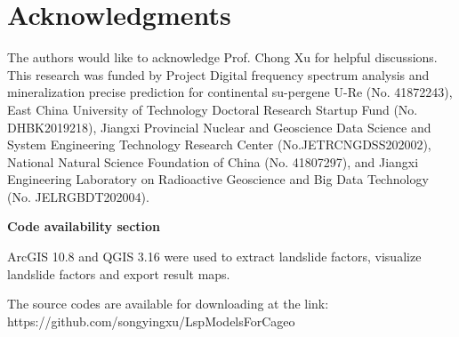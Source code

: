 \documentclass[a4paper,fleqn]{cas-sc}
\begin{document}
\section{Acknowledgments}

The authors would like to acknowledge Prof. Chong Xu for helpful discussions. 
This research was funded by Project Digital frequency spectrum analysis and mineralization precise prediction for continental su-pergene U-Re (No. 41872243), East China University of Technology Doctoral Research Startup Fund (No. DHBK2019218), Jiangxi Provincial Nuclear and Geoscience Data Science and System Engineering Technology Research Center (No.JETRCNGDSS202002), National Natural Science Foundation of China (No. 41807297), and Jiangxi Engineering Laboratory on Radioactive Geoscience and Big Data Technology (No. JELRGBDT202004).

\newpage

\textbf{Code availability section}

ArcGIS 10.8 and QGIS 3.16 were used to extract landslide factors, visualize landslide factors and export result maps.

The source codes are available for downloading at the link:
https://github.com/songyingxu/LspModelsForCageo



 
\end{document}
